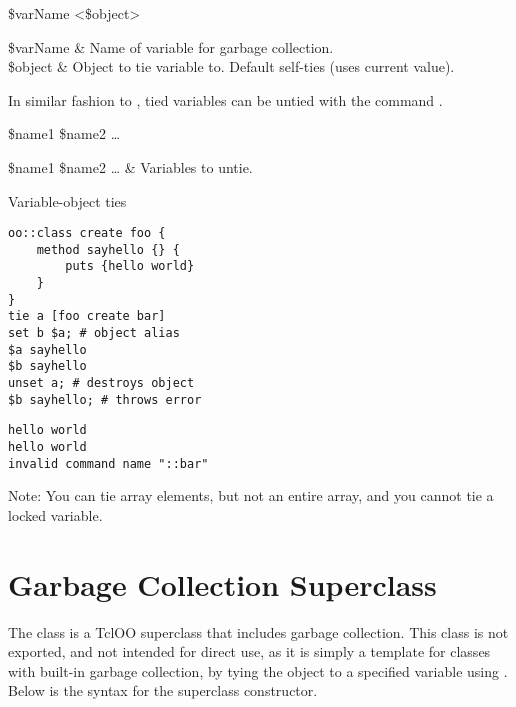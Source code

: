 \documentclass{article}
\begin{document}
\begin{syntax}
 \$varName <\$object>
\end{syntax}
\begin{args}
\$varName & Name of variable for garbage collection. \\
\$object & Object to tie variable to. Default self-ties (uses current value).
\end{args}

In similar fashion to , tied variables can be untied with the command .
\begin{syntax}
 \$name1 \$name2 …
\end{syntax}
\begin{args}
\$name1 \$name2 … & Variables to untie.
\end{args}

\begin{example}{Variable-object ties}
\begin{lstlisting}
oo::class create foo {
    method sayhello {} {
        puts {hello world}
    }
}
tie a [foo create bar]
set b $a; # object alias
$a sayhello
$b sayhello
unset a; # destroys object
$b sayhello; # throws error
\end{lstlisting}
\tcblower
\begin{lstlisting}
hello world
hello world
invalid command name "::bar"
\end{lstlisting}
\end{example}
Note: You can tie array elements, but not an entire array, and you cannot tie a locked variable.

\clearpage
\section{Garbage Collection Superclass}
The class  is a TclOO superclass that includes garbage collection. 
This class is not exported, and not intended for direct use, as it is simply a template for classes with built-in garbage collection, by tying the object to a specified variable using .
Below is the syntax for the superclass constructor.
\end{document}
